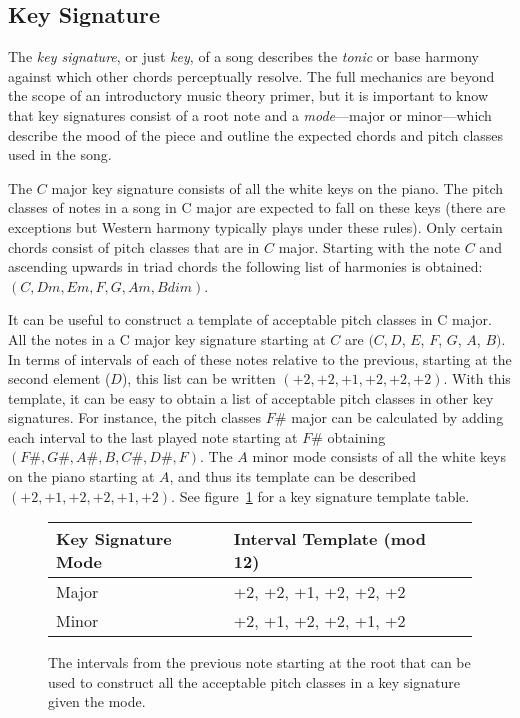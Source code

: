 \subsection{Key Signature}

The \textit{key signature}, or just \textit{key}, of a song describes the \textit{tonic} or base harmony against which other chords perceptually resolve. The full mechanics are beyond the scope of an introductory music theory primer, but it is important to know that key signatures consist of a root note and a \textit{mode}---major or minor---which describe the mood of the piece and outline the expected chords and pitch classes used in the song.

The $C$ major key signature consists of all the white keys on the piano. The pitch classes of notes in a song in C major are expected to fall on these keys (there are exceptions but Western harmony typically plays under these rules). Only certain chords consist of pitch classes that are in $C$ major. Starting with the note $C$ and ascending upwards in triad chords the following list of harmonies is obtained: $(C, Dm, Em, F, G, Am, Bdim)$.

It can be useful to construct a template of acceptable pitch classes in C major. All the notes in a C major key signature starting at $C$ are $(C, D$, $E$, $F$, $G$, $A$, $B)$. In terms of intervals of each of these notes relative to the previous, starting at the second element ($D$), this list can be written $(+2, +2, +1, +2, +2, +2)$. With this template, it can be easy to obtain a list of acceptable pitch classes in other key signatures. For instance, the pitch classes $F\#$ major can be calculated by adding each interval to the last played note starting at $F\#$ obtaining $(F\#,G\#,A\#,B,C\#,D\#,F)$. The $A$ minor mode consists of all the white keys on the piano starting at $A$, and thus its template can be described $(+2,+1,+2,+2,+1,+2)$. See figure~\ref{fig:keysig} for a key signature template table.

\begin{figure}[h]
\centering
\begin{tabular}{lll}
\toprule
Key Signature Mode        & Interval Template (mod 12) \\
\midrule
Major       & +2, +2, +1, +2, +2, +2 \\
Minor       & +2, +1, +2, +2, +1, +2 \\
\bottomrule
\end{tabular}
\caption[Key Signature Mode Intervals]{The intervals from the previous note starting at the root that can be used to construct all the acceptable pitch classes in a key signature given the mode.}
\label{fig:keysig}
\end{figure}

